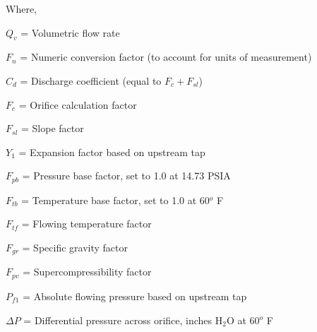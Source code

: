 \noindent
Where,

$Q_v$ = Volumetric flow rate

$F_n$ = Numeric conversion factor (to account for units of measurement)

$C_d$ = Discharge coefficient (equal to $F_c + F_{sl}$)

$F_c$ = Orifice calculation factor

$F_{sl}$ = Slope factor

$Y_1$ = Expansion factor based on upstream tap

$F_{pb}$ = Pressure base factor, set to 1.0 at 14.73 PSIA

$F_{tb}$ = Temperature base factor, set to 1.0 at 60$^{o}$ F

$F_{tf}$ = Flowing temperature factor

$F_{gr}$ = Specific gravity factor

$F_{pv}$ = Supercompressibility factor

$P_{f1}$ = Absolute flowing pressure based on upstream tap

$\Delta P$ = Differential pressure across orifice, inches H$_{2}$O at 60$^{o}$ F











